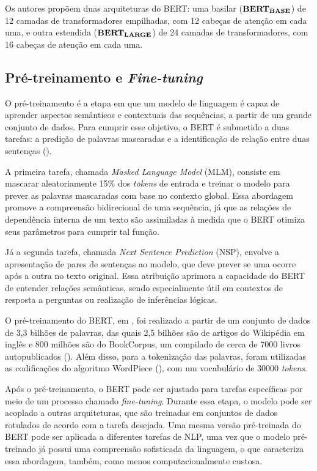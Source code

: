 Os autores \citet{bert2018} propõem duas arquiteturas do BERT: uma basilar ($\text{\textbf{BERT}}_{\text{\textbf{BASE}}}$) de 12 camadas de transformadores empilhadas, com 12 cabeças de atenção em cada uma, e outra estendida ($\text{\textbf{BERT}}_{\text{\textbf{LARGE}}}$) de 24 camadas de transformadores, com 16 cabeças de atenção em cada uma.

\subsection{Pré-treinamento e \textit{Fine-tuning}}

O pré-treinamento é a etapa em que um modelo de linguagem é capaz de aprender aspectos semânticos e contextuais das sequências, a partir de um grande conjunto de dados. Para cumprir esse objetivo, o BERT é submetido a duas tarefas: a predição de palavras mascaradas e a identificação de relação entre duas sentenças (\cite{zhang2023dive}).

A primeira tarefa, chamada \textit{Masked Language Model} (MLM), consiste em mascarar aleatoriamente 15\% dos \textit{tokens} de entrada e treinar o modelo para prever as palavras mascaradas com base no contexto global.  Essa abordagem promove a compreensão bidirecional de uma sequência, já que as relações de dependência interna de um texto são assimiladas à medida que o BERT otimiza seus parâmetros para cumprir tal função.

Já a segunda tarefa, chamada \textit{Next Sentence Prediction} (NSP), envolve a apresentação de pares de sentenças ao modelo, que deve prever se uma ocorre após a outra no texto original. Essa atribuição aprimora a capacidade do BERT de entender relações semânticas, sendo especialmente útil em contextos de resposta a perguntas ou realização de inferências lógicas.

O pré-treinamento do BERT, em \cite{bert2018}, foi realizado a partir de um conjunto de dados de 3,3 bilhões de palavras, das quais 2,5 bilhões são de artigos do Wikipédia em inglês e 800 milhões são do BookCorpus, um compilado de cerca de 7000 livros autopublicados (\cite{zhu2015aligning}). Além disso, para a tokenização das palavras, foram utilizadas as codificações do algoritmo WordPiece (\cite{wu2016googles}), com um vocabulário de 30000 \textit{tokens}.

Após o pré-treinamento, o BERT pode ser ajustado para tarefas específicas por meio de um processo chamado \textit{fine-tuning}. Durante essa etapa, o modelo pode ser acoplado a outras arquiteturas, que são treinadas em conjuntos de dados rotulados de acordo com a tarefa desejada. Uma mesma versão pré-treinada do BERT pode ser aplicada a diferentes tarefas de NLP, uma vez que o modelo pré-treinado já possui uma compreensão sofisticada da linguagem, o que caracteriza essa abordagem, também, como menos computacionalmente custosa.


